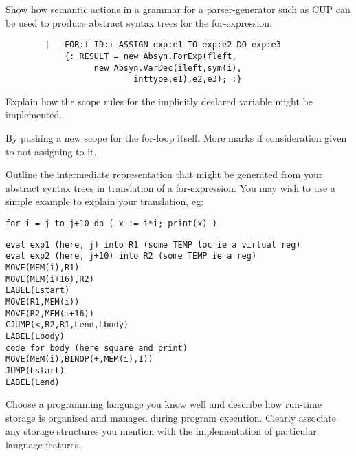 \documentclass[11pt]{cityexam}
\begin{document}
\begin{questions}
\begin{subquestions}
\subquestion
Show how semantic actions in a grammar for a parser-generator such as CUP
can be used to produce abstract syntax trees for the for-expression.

\begin{modelanswer}
\begin{verbatim}
        |   FOR:f ID:i ASSIGN exp:e1 TO exp:e2 DO exp:e3
            {: RESULT = new Absyn.ForExp(fleft, 
                  new Absyn.VarDec(ileft,sym(i),
                          inttype,e1),e2,e3); :}
\end{verbatim}
\end{modelanswer}

\subquestion
Explain how the scope rules for the implicitly declared variable might
be implemented.

\begin{modelanswer}
By pushing a new scope for the for-loop itself. More marks if consideration
given to not assigning to it.
\end{modelanswer}

\subquestion
        Outline the intermediate representation
        that might be generated from your
	abstract syntax trees in translation of
        a for-expression.
	You may wish to use a simple example to explain your 
	translation, eg:
\begin{verbatim}
for i = j to j+10 do ( x := i*i; print(x) )
\end{verbatim}

\begin{modelanswer}
\begin{verbatim}
eval exp1 (here, j) into R1 (some TEMP loc ie a virtual reg)
eval exp2 (here, j+10) into R2 (some TEMP ie a reg)
MOVE(MEM(i),R1)
MOVE(MEM(i+16),R2)
LABEL(Lstart)
MOVE(R1,MEM(i))
MOVE(R2,MEM(i+16))
CJUMP(<,R2,R1,Lend,Lbody)
LABEL(Lbody)
code for body (here square and print)
MOVE(MEM(i),BINOP(+,MEM(i),1))
JUMP(Lstart)
LABEL(Lend)
\end{verbatim}
\end{modelanswer}

\end{subquestions}

\question


\begin{subquestions}

\subquestion
Choose a programming language you know well and describe
how run-time storage is organised and managed during program 
execution.
Clearly associate any storage structures you
mention with the implementation of particular 
language features.


\end{subquestions}
\end{questions}
\end{document}
